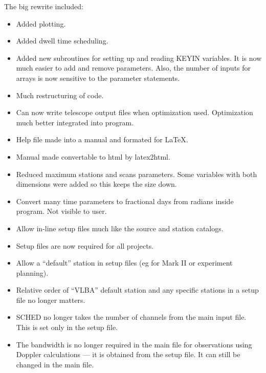 \documentclass{report}
\begin{document}
The big rewrite included:

\begin{itemize}

\item Added plotting.

\item Added dwell time scheduling.

\item Added new subroutines for setting up and reading KEYIN variables.
      It is now much easier to add and remove parameters.  Also,
      the number of inputs for arrays is now sensitive to the parameter
      statements.

\item Much restructuring of code.

\item Can now write telescope output files when optimization used.
      Optimization much better integrated into program.

\item Help file made into a manual and formated for LaTeX.

\item Manual made convertable to html by latex2html.

\item Reduced maximum stations and scans parameters.  Some variables
      with both dimensions were added so this keeps the size down.

\item Convert many time parameters to fractional days from radians
      inside program.  Not visible to user.

\item Allow in-line setup files much like the source and station
      catalogs.

\item Setup files are now required for all projects.

\item Allow a ``default'' station in setup files (eg for Mark II or
      experiment planning).

\item Relative order of ``VLBA'' default station and any specific
      stations in a setup file no longer matters.

\item SCHED no longer takes the number of channels from the main input
      file.  This is set only in the setup file.

\item The bandwidth is no longer required in the main file for
      observations using Doppler calculations --- it is obtained
      from the setup file.  It can still be changed in the main
      file.


\end{itemize}
\end{document}
